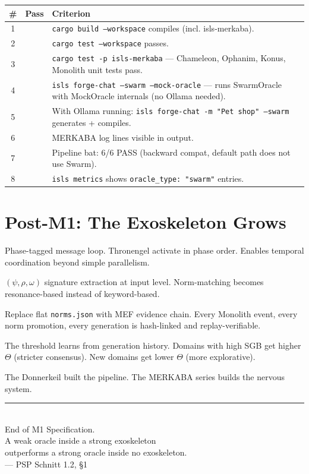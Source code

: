 \documentclass[11pt,a4paper]{article}
\begin{document}
\begin{longtable}{clp{9cm}}
\toprule
\textbf{\#} & \textbf{Pass} & \textbf{Criterion} \\
\midrule
1 & & \texttt{cargo build --workspace} compiles (incl. isls-merkaba). \\
2 & & \texttt{cargo test --workspace} passes. \\
3 & & \texttt{cargo test -p isls-merkaba} --- Chameleon, Ophanim, 
      Konus, Monolith unit tests pass. \\
4 & & \texttt{isls forge-chat --swarm --mock-oracle} --- runs 
      SwarmOracle with MockOracle internals (no Ollama needed). \\
5 & & With Ollama running: \texttt{isls forge-chat -m "Pet shop" 
      --swarm} generates + compiles. \\
6 & & MERKABA log lines visible in output. \\
7 & & Pipeline bat: 6/6 PASS (backward compat, default path 
      does not use Swarm). \\
8 & & \texttt{isls metrics} shows \texttt{oracle\_type: "swarm"} 
      entries. \\
\bottomrule
\end{longtable}


\section{Post-M1: The Exoskeleton Grows}

\begin{description}[nosep]
\item[M2 --- ScorpioSync Clock:] Phase-tagged message loop. 
  Thronengel activate in phase order. Enables temporal 
  coordination beyond simple parallelism.
\item[M3 --- Gabriel Cells:] $(\psi, \rho, \omega)$ signature 
  extraction at input level. Norm-matching becomes resonance-based 
  instead of keyword-based.
\item[M4 --- Hash-Chained Ledger:] Replace flat \texttt{norms.json} 
  with MEF evidence chain. Every Monolith event, every norm 
  promotion, every generation is hash-linked and replay-verifiable.
\item[M5 --- Adaptive $\Theta$:] The threshold learns from 
  generation history. Domains with high SGB get higher $\Theta$ 
  (stricter consensus). New domains get lower $\Theta$ 
  (more explorative).
\end{description}

The Donnerkeil built the pipeline. The MERKABA series builds 
the nervous system.

\vfill
\begin{center}
\color{isls-gray}\rule{0.5\textwidth}{0.4pt}\\[0.5em]
{\small End of M1 Specification.\\[0.3em]
A weak oracle inside a strong exoskeleton\\
outperforms a strong oracle inside no exoskeleton.\\
--- PSP Schnitt 1.2, \S1}
\end{center}
\end{document}
